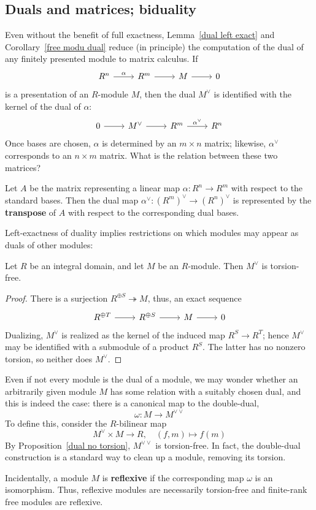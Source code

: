 \subsection{Duals and matrices; biduality}
Even without the benefit of full exactness,
Lemma~\ref{dual left exact} and Corollary~\ref{free modu dual} reduce (in principle) the computation of the dual of any finitely presented module to matrix calculus. If
\[\begin{tikzcd}
R^n\ar[r,"\alpha"]&R^m\ar[r]&M\ar[r]&0
\end{tikzcd}\]
is a presentation of an $R$-module $M$, then the dual $M^{\vee}$ is identified with the kernel
of the dual of $\alpha$:
\[\begin{tikzcd}
0\ar[r]&M^{\vee}\ar[r]&R^m\ar[r,"\alpha^\vee"]&R^n
\end{tikzcd}\]
Once bases are chosen, $\alpha$ is determined by an $m\times n$ matrix; likewise, $\alpha^\vee$ corresponds to an $n\times m$ matrix. What is the relation between these two matrices?
\begin{lemma}
Let $A$ be the matrix representing a linear map $\alpha:R^n\to R^m$ with respect to the standard bases. Then the dual map $\alpha^\vee:(R^m)^\vee\to(R^n)^\vee$ is represented by the \textbf{transpose} of $A$ with respect to the corresponding dual bases.
\end{lemma}
Left-exactness of duality implies restrictions on which modules may appear as duals of other modules:
\begin{proposition}\label{dual no torsion}
Let $R$ be an integral domain, and let $M$ be an $R$-module. Then $M^\vee$ is torsion-free.
\end{proposition}
\begin{proof}
There is a surjection $R^{\oplus S}\twoheadrightarrow M$, thus, an exact sequence
\[\begin{tikzcd}
R^{\oplus T}\ar[r]&R^{\oplus S}\ar[r]&M\ar[r]&0
\end{tikzcd}\]
Dualizing, $M^{\vee}$ is realized as the kernel of the induced map $R^S\to R^T$; hence $M^{\vee}$
may be identified with a submodule of a product $R^S$. The latter has no nonzero torsion, so neither does $M^{\vee}$.
\end{proof}
Even if not every module is the dual of a module, we may wonder whether an arbitrarily given module $M$ has some relation with a suitably chosen dual, and this is indeed the case: there is a canonical map to the double-dual,
\[\omega:M\to M^{\vee\vee}\]
To define this, consider the $R$-bilinear map
\[M^{\vee}\times M\to R,\quad (f,m)\mapsto f(m)\]
By Proposition~\ref{dual no torsion}, $M^{\vee\vee}$ is torsion-free. In fact, the double-dual construction is a standard way to clean up a module, removing its torsion.\par
Incidentally, a module $M$ is \textbf{reflexive} if the corresponding map $\omega$ is an isomorphism. Thus, reflexive modules are necessarily torsion-free and finite-rank free modules are reflexive.
